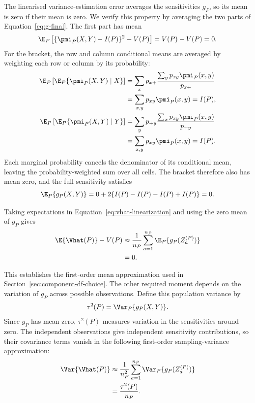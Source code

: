 The linearised variance-estimation error averages the sensitivities
\(g_P\), so its mean is zero if their mean is zero. We verify this
property by averaging the two parts of Equation~\eqref{eq:g-final}.
The first part has mean
\begin{equation}
  \E_P\left[\{\pmi_P(X,Y)-I(P)\}^2-V(P)\right]
  =V(P)-V(P)=0.
\end{equation}
For the bracket, the row and column conditional means are averaged by
weighting each row or column by its probability:
\begin{align}
  \E_P\left[\E_P\{\pmi_P(X,Y)\mid X\}\right]
  &=\sum_x p_{x+}
    \frac{\sum_y p_{xy}\pmi_P(x,y)}{p_{x+}}
    \notag\\
  &=\sum_{x,y}p_{xy}\pmi_P(x,y)=I(P),\\
  \E_P\left[\E_P\{\pmi_P(X,Y)\mid Y\}\right]
  &=\sum_y p_{+y}
    \frac{\sum_x p_{xy}\pmi_P(x,y)}{p_{+y}}
    \notag\\
  &=\sum_{x,y}p_{xy}\pmi_P(x,y)=I(P).
\end{align}
Each marginal probability cancels the denominator of its conditional mean,
leaving the probability-weighted sum over all cells. The bracket therefore
also has mean zero, and the full sensitivity satisfies
\begin{equation}
  \E_P\{g_P(X,Y)\}
  =0+2\{I(P)-I(P)-I(P)+I(P)\}=0.
\end{equation}
\begin{samepage}%
Taking expectations in Equation~\eqref{eq:vhat-linearization} and using
the zero mean of \(g_P\) gives
\begin{align*}
  \E\{\Vhat(P)\}-V(P)
  &\approx\frac{1}{n_P}\sum_{a=1}^{n_P}
    \E_P\{g_P(Z_a^{(P)})\}\\
  &=0.
\end{align*}
\par
\end{samepage}
This establishes the first-order mean approximation used in
Section~\ref{sec:component-df-choice}. The other required moment depends
on the variation of \(g_P\) across possible observations. Define this
population variance by
\begin{equation}
  \tau^2(P)=\Var_P\{g_P(X,Y)\}.
  \label{eq:tau-definition}
\end{equation}
Since \(g_P\) has mean zero, \(\tau^2(P)\) measures variation in the
sensitivities around zero. The independent observations give
independent sensitivity contributions, so their covariance terms vanish
in the following first-order sampling-variance approximation:
\begin{align}
  \Var\{\Vhat(P)\}
  &\approx
  \frac{1}{n_P^2}
  \sum_{a=1}^{n_P}
  \Var_P\{g_P(Z_a^{(P)})\}\\*
  &=\frac{\tau^2(P)}{n_P}.
  \label{eq:vhat-sampling-variance}
\end{align}

